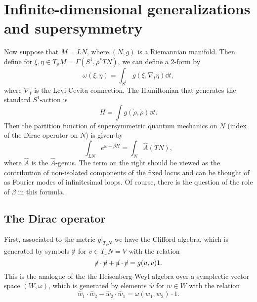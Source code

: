 \documentclass[leqno, openany]{memoir}
\theoremstyle{definition}
\theoremstyle{remark}
\theoremstyle{plain}
\theoremstyle{definition}
\theoremstyle{remark}
\newcommand{\wh}[1]{\widehat{#1}}
\begin{document}
\section{Infinite-dimensional generalizations and supersymmetry}
\label{sec:infinite-supersymmetry}

Now suppose that $M = LN$, where $(N, g)$ is a Riemannian manifold. Then define for $\xi, \eta \in T_{\rho} M = \Gamma(S^1, \rho^* TN)$, we can define a $2$-form by
\[ \omega(\xi, \eta) = \int_{S^1} g(\xi, \nabla_t \eta) \dd{t}, \]
where $\nabla_t$ is the Levi-Cevita connection. The Hamiltonian that generates the standard $S^1$-action is
\[ H = \int g(\dot{\rho}, \dot{\rho}) \dd{t}. \]
Then the partition function of supersymmetric quantum mechanics on $N$ (index of the Dirac operator on $N$) is given by
\[ \int_{LN} e^{\omega - \beta H} = \int_N \wh{A}(TN), \]
where $\wh{A}$ is the $\wh{A}$-genus. The term on the right should be viewed as the contribution of non-isolated components of the fixed locus and can be thought of as Fourier modes of infinitesimal loops. Of course, there is the question of the role of $\beta$ in this formula.

\subsection{The Dirac operator}
\label{subsec:dirac}

First, associated to the metric $g |_{T_x N}$ we have the Clifford algebra, which is generated by symbols $\cancel{v}$ for $v \in T_x N = V$ with the relation
\[ \cancel{v} \cdot \cancel{u} + \cancel{u} \cdot \cancel{v} = g(u,v) 1. \]
This is the analogue of the the Heisenberg-Weyl algebra over a symplectic vector space $(W,\omega)$, which is generated by elements $\wh{w}$ for $w \in W$ with the relation
\[ \wh{w}_1 \cdot \wh{w}_2 - \wh{w}_2 \cdot \wh{w}_1 = \omega(w_1, w_2) \cdot 1. \]
\end{document}
